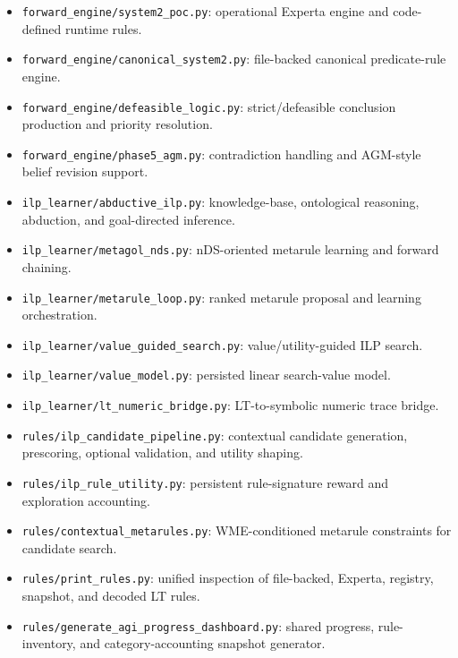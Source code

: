 \documentclass[14pt]{article}
\begin{document}
\begin{description}[style=nextline,leftmargin=1.5em]
  \item[System 2: forward reasoning.]
    \begin{itemize}[leftmargin=1.5em]
      \item \texttt{forward\_engine/system2\_poc.py}: operational Experta
            engine and code-defined runtime rules.
      \item \texttt{forward\_engine/canonical\_system2.py}: file-backed
            canonical predicate-rule engine.
      \item \texttt{forward\_engine/defeasible\_logic.py}: strict/defeasible
            conclusion production and priority resolution.
      \item \texttt{forward\_engine/phase5\_agm.py}: contradiction handling
            and AGM-style belief revision support.
    \end{itemize}

  \item[System 3 and rule learning.]
    \begin{itemize}[leftmargin=1.5em]
      \item \texttt{ilp\_learner/abductive\_ilp.py}: knowledge-base,
            ontological reasoning, abduction, and goal-directed inference.
      \item \texttt{ilp\_learner/metagol\_nds.py}: nDS-oriented metarule
            learning and forward chaining.
      \item \texttt{ilp\_learner/metarule\_loop.py}: ranked metarule proposal
            and learning orchestration.
      \item \texttt{ilp\_learner/value\_guided\_search.py}: value/utility-guided
            ILP search.
      \item \texttt{ilp\_learner/value\_model.py}: persisted linear search-value
            model.
      \item \texttt{ilp\_learner/lt\_numeric\_bridge.py}: LT-to-symbolic numeric
            trace bridge.
    \end{itemize}

  \item[Shared rule-pool learning and inspection.]
    \begin{itemize}[leftmargin=1.5em]
      \item \texttt{rules/ilp\_candidate\_pipeline.py}: contextual candidate
            generation, prescoring, optional validation, and utility shaping.
      \item \texttt{rules/ilp\_rule\_utility.py}: persistent rule-signature
            reward and exploration accounting.
      \item \texttt{rules/contextual\_metarules.py}: WME-conditioned metarule
            constraints for candidate search.
      \item \texttt{rules/print\_rules.py}: unified inspection of file-backed,
            Experta, registry, snapshot, and decoded LT rules.
      \item \texttt{rules/generate\_agi\_progress\_dashboard.py}: shared progress,
            rule-inventory, and category-accounting snapshot generator.
    \end{itemize}
\end{description}
\end{document}
